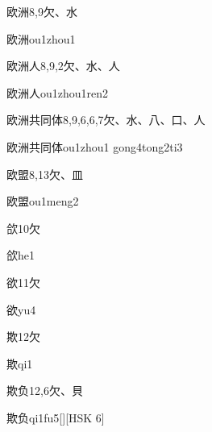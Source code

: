 \begin{Entry}{欧洲}{8,9}{⽋、⽔}
  \begin{Phonetics}{欧洲}{ou1zhou1}
  \end{Phonetics}
\end{Entry}

\begin{Entry}{欧洲人}{8,9,2}{⽋、⽔、⼈}
  \begin{Phonetics}{欧洲人}{ou1zhou1ren2}
  \end{Phonetics}
\end{Entry}

\begin{Entry}{欧洲共同体}{8,9,6,6,7}{⽋、⽔、⼋、⼝、⼈}
  \begin{Phonetics}{欧洲共同体}{ou1zhou1 gong4tong2ti3}
  \end{Phonetics}
\end{Entry}

\begin{Entry}{欧盟}{8,13}{⽋、⽫}
  \begin{Phonetics}{欧盟}{ou1meng2}
  \end{Phonetics}
\end{Entry}

\begin{Entry}{欱}{10}{⽋}
  \begin{Phonetics}{欱}{he1}
  \end{Phonetics}
\end{Entry}

\begin{Entry}{欲}{11}{⽋}
  \begin{Phonetics}{欲}{yu4}
  \end{Phonetics}
\end{Entry}

\begin{Entry}{欺}{12}{⽋}
  \begin{Phonetics}{欺}{qi1}
  \end{Phonetics}
\end{Entry}

\begin{Entry}{欺负}{12,6}{⽋、⾙}
  \begin{Phonetics}{欺负}{qi1fu5}[][HSK 6]
  \end{Phonetics}
\end{Entry}


